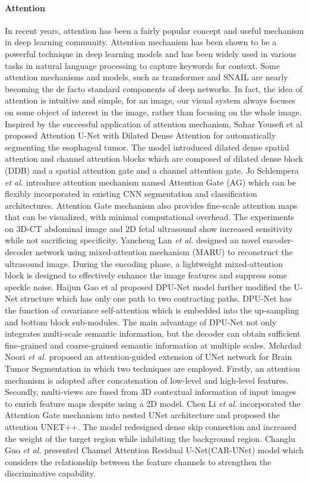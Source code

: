 \documentclass{ieeeaccess}
\begin{document}
  \paragraph{Attention}
  In recent years, attention has been a fairly popular concept and useful mechanism in deep learning community. Attention mechanism has been shown to be a powerful technique in deep learning models and has been widely used in various tasks in natural language processing to capture keywords for context. Some attention mechanisms and models, such as transformer and SNAIL are nearly becoming the de facto standard components of deep networks. In fact, the idea of attention is intuitive and simple, for an image, our visual system always focuses on some object of interest in the image, rather than focusing on the whole image. Inspired by the successful application of attention mechanism, Sahar Yousefi et al proposed Attention U-Net with Dilated Dense Attention for automatically segmenting the esophageal tumor\cite{YousefiSELMZDS20}. The model introduced dilated dense spatial attention and channel attention blocks which are composed of dilated dense block (DDB) and a spatial attention gate and a channel attention gate. Jo Schlempera \emph{et al.} introduce attention mechanism named Attention Gate (AG) which can be flexibly incorporated in existing CNN segmentation and classification architectures\cite{OktaySFLHMMMHKGR18}. Attention Gate mechanism also provides fine-scale attention maps that can be visualized, with minimal computational overhead. The experiments on 3D-CT abdominal image and 2D fetal ultrasound show increased sensitivity while not sacrificing specificity. Yancheng Lan \emph{et al.} designed an novel encoder-decoder network using mixed-attention mechanism (MARU) to reconstruct the ultrasound image\cite{LanZ20}. During the encoding phase, a lightweight mixed-attention block is designed to effectively enhance the image features and suppress some speckle noise. Haijun Gao et al proposed DPU-Net model further modified the U-Net structure which has only one path to two contracting paths\cite{GaoZPZ20}. DPU-Net has the function of covariance self-attention which is embedded into the up-sampling and bottom block sub-modules. The main advantage of DPU-Net not only integrates multi-scale semantic information, but the decoder can obtain sufficient fine-grained and coarse-grained semantic information at multiple scales. Mehrdad Noori \emph{et al.} proposed an attention-guided extension of UNet network for Brain Tumor Segmentation in which two techniques are employed\cite{NooriBM20}. Firstly, an attention mechanism is adopted after concatenation of low-level and high-level features. Secondly, multi-views are fused from 3D contextual information of input images to enrich feature maps despite using a 2D model. Chen Li \emph{et al.} incorporated the Attention Gate mechanism into nested UNet architecture and proposed the attention UNET++. The model redesigned dense skip connection and increased the weight of the target region while inhibiting the background region\cite{LiTCLGJW20}. Changlu Guo \emph{et al.} presented Channel Attention Residual U-Net(CAR-UNet) model which considers the relationship between the feature channels to strengthen the discriminative capability\cite{GauSYZ20}. 
\end{document}
